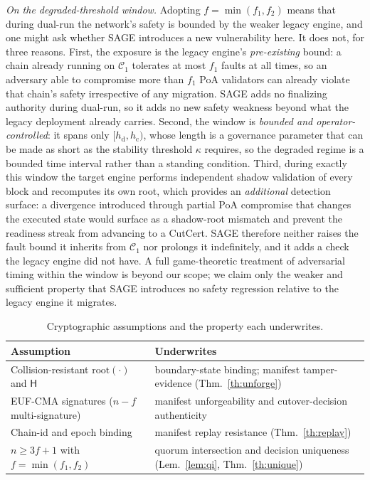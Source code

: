 \documentclass[journal]{IEEEtran}
\theoremstyle{remark}
\begin{document}
\emph{On the degraded-threshold window.} Adopting $f=\min(f_1,f_2)$ means that during dual-run
the network's safety is bounded by the weaker legacy engine, and one might ask whether SAGE
introduces a new vulnerability here. It does not, for three reasons. First, the exposure is the
legacy engine's \emph{pre-existing} bound: a chain already running on $\mathcal{C}_1$ tolerates at
most $f_1$ faults at all times, so an adversary able to compromise more than $f_1$ PoA validators
can already violate that chain's safety irrespective of any migration. SAGE adds no finalizing
authority during dual-run, so it adds no new safety weakness beyond what the legacy deployment
already carries. Second, the window is \emph{bounded and operator-controlled}: it spans only
$[h_{\mathrm{d}}, h_{\mathrm{c}})$, whose length is a governance parameter that can be made as short
as the stability threshold $\kappa$ requires, so the degraded regime is a bounded time interval
rather than a standing condition. Third, during exactly this window the target engine performs
independent shadow validation of every block and recomputes its own root, which provides an
\emph{additional} detection surface: a divergence introduced through partial PoA compromise that
changes the executed state would surface as a shadow-root mismatch and prevent the readiness streak
from advancing to a CutCert. SAGE therefore neither raises the fault bound it inherits from
$\mathcal{C}_1$ nor prolongs it indefinitely, and it adds a check the legacy engine did not have. A
full game-theoretic treatment of adversarial timing within the window is beyond our scope; we claim
only the weaker and sufficient property that SAGE introduces no safety regression relative to the
legacy engine it migrates.

\begin{table}[t]
\centering
\caption{Cryptographic assumptions and the property each underwrites.}
\label{tab:crypto}
\renewcommand{\arraystretch}{1.15}
\footnotesize
\begin{tabular}{p{}p{}}
\toprule
Assumption & Underwrites \\
\midrule
Collision-resistant $\mathrm{root}(\cdot)$ and $\mathsf{H}$ & boundary-state binding; manifest tamper-evidence (Thm.~\ref{th:unforge}) \\
EUF-CMA signatures ($n{-}f$ multi-signature) & manifest unforgeability and cutover-decision authenticity \\
Chain-id and epoch binding & manifest replay resistance (Thm.~\ref{th:replay}) \\
$n \ge 3f+1$ with $f=\min(f_1,f_2)$ & quorum intersection and decision uniqueness (Lem.~\ref{lem:qi}, Thm.~\ref{th:unique}) \\
\bottomrule
\end{tabular}
\end{table}
\end{document}
